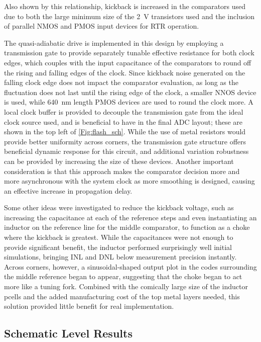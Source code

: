 \documentclass[11pt,letterpaper]{article}
\begin{document}
\noindent Also shown by this relationship, kickback is increased in the comparators used due to both the large minimum size of the \qty{2}{\V} transistors used and the inclusion of parallel NMOS and PMOS input devices for RTR operation. 

The quasi-adiabatic drive is implemented in this design by employing a transmission gate to provide separately tunable effective resistance for both clock edges, which couples with the input capacitance of the comparators to round off the rising and falling edges of the clock. Since kickback noise generated on the falling clock edge does not impact the comparator evaluation, as long as the fluctuation does not last until the rising edge of the clock, a smaller NNOS device is used, while \qty{640}{\nm} length PMOS devices are used to round the clock more. A local clock buffer is provided to decouple the transmission gate from the ideal clock source used, and is beneficial to have in the final ADC layout; these are shown in the top left of \cref{Fig:flash_sch}. While the use of metal resistors would provide better uniformity across corners, the transmission gate structure offers beneficial dynamic response for this circuit, and additional variation robustness can be provided by increasing the size of these devices. Another important consideration is that this approach makes the comparator decision more and more asynchronous with the system clock as more smoothing is designed, causing an effective increase in propagation delay.

Some other ideas were investigated to reduce the kickback voltage, such as increasing the capacitance at each of the reference steps and even instantiating an inductor on the reference line for the middle comparator, to function as a choke where the kickback is greatest. While the capacitances were not enough to provide significant benefit, the inductor performed surprisingly well initial simulations, bringing INL and DNL below measurement precision instantly. Across corners, however, a sinusoidal-shaped output plot in the codes surrounding the middle reference began to appear, suggesting that the choke began to act more like a tuning fork. Combined with the comically large size of the inductor pcells and the added manufacturing cost of the top metal layers needed, this solution provided little benefit for real implementation.

\subsection{Schematic Level Results}
\end{document}
